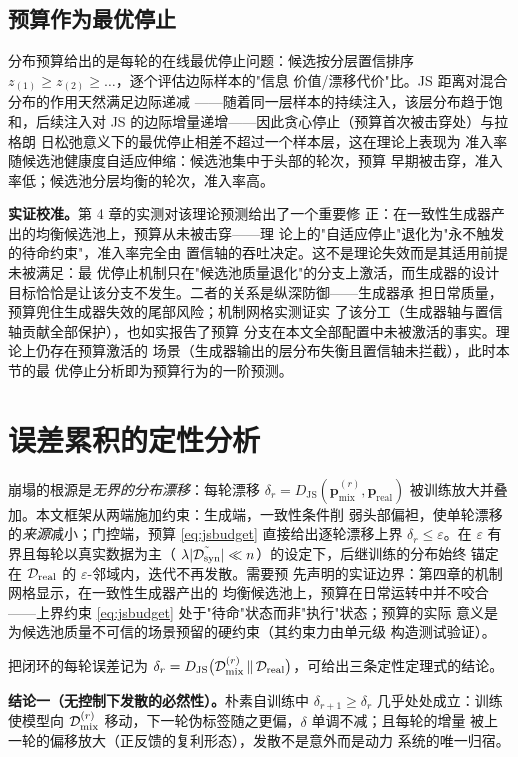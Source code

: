 \subsection{预算作为最优停止}
分布预算给出的是每轮的在线最优停止问题：候选按分层置信排序
$z_{(1)} \geq z_{(2)} \geq \dots$，逐个评估边际样本的"信息
价值/漂移代价"比。JS 距离对混合分布的作用天然满足边际递减
——随着同一层样本的持续注入，该层分布趋于饱和，后续注入对
JS 的边际增量递增——因此贪心停止（预算首次被击穿处）与拉格朗
日松弛意义下的最优停止相差不超过一个样本层，这在理论上表现为
准入率随候选池健康度自适应伸缩：候选池集中于头部的轮次，预算
早期被击穿，准入率低；候选池分层均衡的轮次，准入率高。

\textbf{实证校准。}第 4 章的实测对该理论预测给出了一个重要修
正：在一致性生成器产出的均衡候选池上，预算从未被击穿——理
论上的"自适应停止"退化为"永不触发的待命约束"，准入率完全由
置信轴的吞吐决定。这不是理论失效而是其适用前提未被满足：最
优停止机制只在"候选池质量退化"的分支上激活，而生成器的设计
目标恰恰是让该分支不发生。二者的关系是纵深防御——生成器承
担日常质量，预算兜住生成器失效的尾部风险；机制网格实测证实
了该分工（生成器轴与置信轴贡献全部保护），也如实报告了预算
分支在本文全部配置中未被激活的事实。理论上仍存在预算激活的
场景（生成器输出的层分布失衡且置信轴未拦截），此时本节的最
优停止分析即为预算行为的一阶预测。

\section{误差累积的定性分析}
崩塌的根源是\emph{无界的分布漂移}：每轮漂移 $\delta_r =
D_{\mathrm{JS}}(\bm{p}_{\mathrm{mix}}^{(r)}, \bm{p}_{\mathrm{real}})$
被训练放大并叠加。本文框架从两端施加约束：生成端，一致性条件削
弱头部偏袒，使单轮漂移的\emph{来源}减小；门控端，预算
\eqref{eq:jsbudget} 直接给出逐轮漂移上界 $\delta_r \leq
\varepsilon$。在 $\varepsilon$ 有界且每轮以真实数据为主（
$\lambda |\tilde{\mathcal{D}_{\mathrm{syn}}}| \ll n$）的设定下，后继训练的分布始终
锚定在 $\mathcal{D}_{\mathrm{real}}$ 的 $\varepsilon$-邻域内，迭代不再发散。需要预
先声明的实证边界：第四章的机制网格显示，在一致性生成器产出的
均衡候选池上，预算在日常运转中并不咬合——上界约束
\eqref{eq:jsbudget} 处于"待命"状态而非"执行"状态；预算的实际
意义是为候选池质量不可信的场景预留的硬约束（其约束力由单元级
构造测试验证）。

把闭环的每轮误差记为 $\delta_r = D_{\mathrm{JS}}\big(
\mathcal{D}_{\mathrm{mix}}^{(r)} \,\|\, \mathcal{D}_{\mathrm{real}}\big)$，可给出三条定性定理式的结论。

\textbf{结论一（无控制下发散的必然性）。}朴素自训练中 $\delta
_{r+1} \geq \delta_r$ 几乎处处成立：训练使模型向 $\mathcal{D}_{\mathrm{mix}}^{(r)}$
移动，下一轮伪标签随之更偏，$\delta$ 单调不减；且每轮的增量
被上一轮的偏移放大（正反馈的复利形态），发散不是意外而是动力
系统的唯一归宿。

